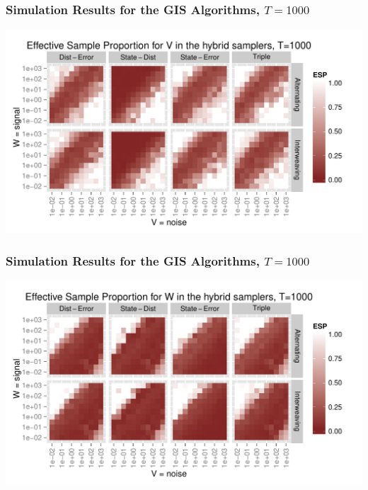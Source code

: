\documentclass[xcolor=dvipsnames]{beamer}\usepackage{graphicx, color}
\newenvironment{knitrout}{}{} %
\begin{document}
\begin{frame}
    \frametitle{Simulation Results for the GIS Algorithms, $T=1000$}
    
\begin{knitrout}\footnotesize
{}\color{fgcolor}
\includegraphics[width=1\textwidth]{figure/altintESplotT1000-1} 

\end{knitrout}


\end{frame}

\begin{frame}
    \frametitle{Simulation Results for the GIS Algorithms, $T=1000$}
    
\begin{knitrout}\footnotesize
{}\color{fgcolor}
\includegraphics[width=1\textwidth]{figure/altintESplotT1000-2} 

\end{knitrout}

\end{frame}
\end{document}

